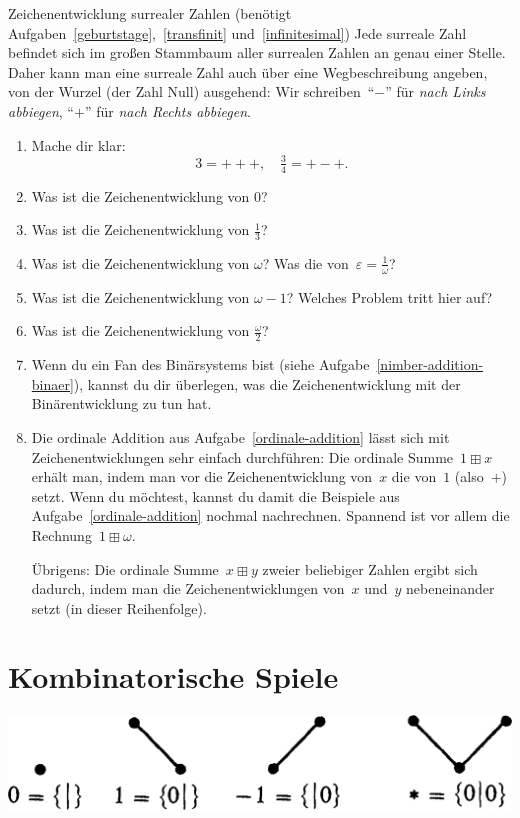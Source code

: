 \documentclass{zirkelblatt}
\newcommand{\head}[1]{\section*{\rmfamily #1}}%
\begin{document}
\begin{aufgabe}{Zeichenentwicklung surrealer Zahlen
(benötigt Aufgaben~\ref{geburtstage},~\ref{transfinit}
und~\ref{infinitesimal})}
Jede surreale Zahl befindet sich im großen Stammbaum aller surrealen Zahlen an
genau einer Stelle. Daher kann man eine surreale Zahl auch über eine
Wegbeschreibung angeben, von der Wurzel (der Zahl Null) ausgehend: Wir
schreiben~"`$-$"' für \emph{nach Links abbiegen}, "`$+$"' für \emph{nach Rechts
abbiegen}.
\begin{enumerate}
\item Mache dir klar:
\[ 3 = {+}{+}{+}, \quad \tfrac{3}{4} = {+}{-}{+}. \]
\item Was ist die Zeichenentwicklung von $0$?
\item Was ist die Zeichenentwicklung von $\tfrac{1}{3}$?
\item Was ist die Zeichenentwicklung von $\omega$? Was die von~$\varepsilon =
\tfrac{1}{\omega}$?
\item Was ist die Zeichenentwicklung von $\omega-1$? Welches Problem tritt hier
auf?
\item Was ist die Zeichenentwicklung von $\tfrac{\omega}{2}$?
\item Wenn du ein Fan des Binärsystems bist (siehe
Aufgabe~\ref{nimber-addition-binaer}), kannst du dir überlegen, was die
Zeichenentwicklung mit der Binärentwicklung zu tun hat.
\item Die ordinale Addition aus Aufgabe~\ref{ordinale-addition} lässt sich mit
Zeichenentwicklungen sehr einfach durchführen: Die ordinale Summe~$1 \boxplus
x$ erhält man, indem man vor die Zeichenentwicklung von~$x$ die von~$1$
(also~${+}$) setzt. Wenn du möchtest, kannst du damit die Beispiele aus
Aufgabe~\ref{ordinale-addition} nochmal nachrechnen. Spannend ist vor allem die
Rechnung~$1 \boxplus \omega$.

Übrigens: Die ordinale Summe~$x \boxplus y$ zweier beliebiger Zahlen ergibt
sich dadurch, indem man die Zeichenentwicklungen von~$x$ und~$y$ nebeneinander
setzt (in dieser Reihenfolge).
\end{enumerate}
\end{aufgabe}


\head{Kombinatorische Spiele}

\begin{center}\includegraphics[scale=0.2]{einfache-spiele}\end{center}
\end{document}
